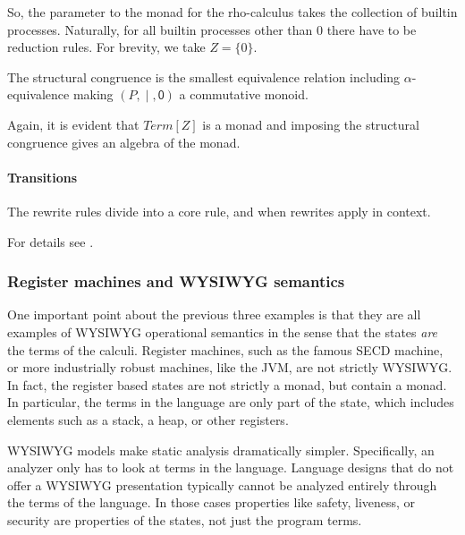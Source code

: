 So, the parameter to the monad for the rho-calculus takes the collection of builtin processes. Naturally, for all builtin processes other than $0$ there have to be reduction rules. For brevity, we take $Z = \{0\}$.

The structural congruence is the smallest equivalence relation including $\alpha$-equivalence making $(P,\;\mathsf{|}\;,\mathsf{0})$ a commutative monoid.

Again, it is evident that $Term[Z]$ is a monad and imposing the structural congruence gives an algebra of the monad.

\paragraph{Transitions}
The rewrite rules divide into a core rule, and when rewrites apply in
context.

For details see \cite{DBLP:journals/entcs/MeredithR05}.

\subsubsection{Register machines and WYSIWYG semantics}One important point about the previous three
examples is that they are all examples of WYSIWYG operational
semantics in the sense that the states \emph{are} the terms of the
calculi. Register machines, such as the famous SECD machine, or more industrially robust machines, like the JVM, are not strictly WYSIWYG. \cite{DBLP:conf/sac/Buday15} \cite{JVM7Spec} In fact, the register based states are not strictly a monad, but contain a monad. In particular, the terms in the language are only
part of the state, which includes elements such as a stack, a heap, or other registers.

WYSIWYG models make static analysis dramatically
simpler. Specifically, an analyzer only has to look at terms in the
language. Language designs that do not offer a WYSIWYG presentation
typically cannot be analyzed entirely through the terms of the
language. In those cases properties like safety, liveness, or security
are properties of the states, not just the program terms.
